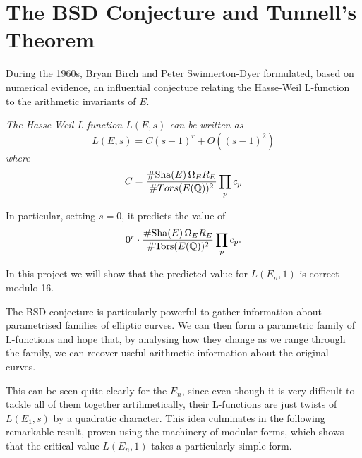 \documentclass[12pt, a4paper]{report}
\begin{document}
\section{The BSD Conjecture and Tunnell's Theorem}

During the 1960s, Bryan Birch and Peter Swinnerton-Dyer formulated, based
on numerical evidence, an influential conjecture relating the Hasse-Weil
L-function to the arithmetic invariants of $E$.

\begin{conj} \normalfont
  \textit{The Hasse-Weil L-function $L(E,s)$ can be written as
  \[L(E,s) = C (s-1)^r + O((s-1)^2)\] where}
\begin{equation} \label{eq:bsd}
  C = \frac{\#\text{Sha}(E) \, \Omega_E R_E}{\#Tors(E({\mathbb Q}))^2} \prod_p c_p
\end{equation}
\end{conj}

In particular, setting $s = 0$, it predicts the value of
\[0^r \cdot \frac{\# \text{\normalfont Sha}(E) \, \Omega_E R_E}{\# {\text{\normalfont Tors}}(E({\mathbb Q}))^2} \prod_p c_p .\]

In this project we will show that the predicted value for $L(E_n,1)$
is correct modulo 16.

The BSD conjecture is particularly powerful to gather information about
parametrised families of elliptic curves. We can then form a parametric
family of L-functions and hope that, by analysing how they change as we range
through the family, we can recover useful
arithmetic information about the original curves.

This can be seen quite clearly
for the $E_n$, since even though it is very difficult to tackle all of them
together artihmetically, their L-functions are just twists of $L(E_1,s)$ by a
quadratic character.
This idea culminates in the following remarkable result, proven using
the machinery of modular forms, which shows that the critical value
$L(E_n,1)$ takes a particularly simple form.
\end{document}
